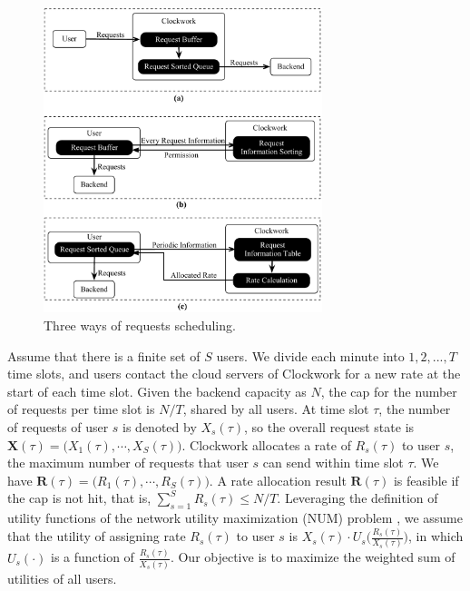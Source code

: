 \begin{figure}[t]
	\center
	\hspace{-0cm}
	\includegraphics[width=3.2in]{figs/schedule}
	\caption{Three ways of requests scheduling.} \label{fig:sch}
	\vspace{-0.cm}
\end{figure}     

Assume that there is a finite set of $S$ users. We divide each minute into $1,2,...,T$ time slots, and users contact the cloud servers of Clockwork for a new rate at the start of each time slot. Given the backend capacity as $N$, the cap for the number of requests per time slot is $N/T$, shared by all users. At time slot $\tau$, the number of requests of user $s$ is denoted by $X_s(\tau)$, so the overall request state is $\pmb{X}(\tau)=\big(X_1(\tau), \cdots, X_S(\tau)\big)$. Clockwork allocates a rate of $R_s(\tau)$ to user $s$, the maximum number of requests that user $s$ can send within time slot $\tau$. We have $\pmb{R}(\tau) = \big(R_1(\tau),\cdots,R_S(\tau)\big)$. A rate allocation result $\pmb{R}(\tau)$ is feasible if the cap is not hit, that is, $\sum_{s=1}^{S}R_s(\tau) \le N/T$. Leveraging the definition of utility functions of the network utility maximization (NUM) problem \cite{yi2008stochastic}, we assume that the utility of assigning rate $R_s(\tau)$ to user $s$ is $X_s(\tau)\cdot U_s\big(\frac{R_s(\tau)}{X_s(\tau)}\big)$, in which $U_s(\cdot)$ is a function of $\frac{R_s(\tau)}{X_s(\tau)}$. Our objective  is to maximize the weighted sum of utilities of all users.

